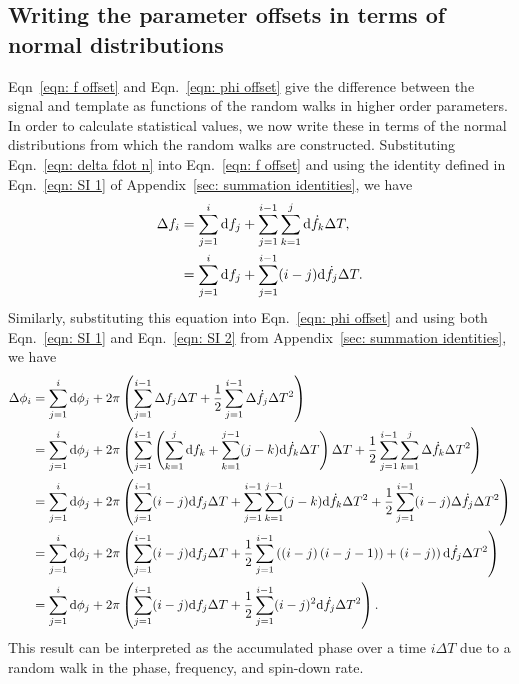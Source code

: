 \documentclass[../full_thesis/full_thesis.tex]{subfiles}
\begin{document}
\subsection{Writing the parameter offsets in terms of normal distributions}
Eqn~\eqref{eqn: f offset} and Eqn.~\eqref{eqn: phi offset} give the difference
between the signal and template as
functions of the random walks in higher order parameters. In order to calculate
statistical values, we now write these in terms of the normal distributions
from which the random walks are constructed.  Substituting Eqn.~\eqref{eqn:
delta fdot n} into Eqn.~\eqref{eqn: f offset} and using the identity defined
in Eqn.~\eqref{eqn: SI 1} of Appendix~\ref{sec: summation identities}, we have
\begin{align}
\Delta f_{i}  & = \sum_{j=1}^{i}\mathrm{d} f_{j}
+ \sum_{j=1}^{i-1}\sum_{k=1}^{j}\mathrm{d} \dot{f}_{k} \Delta T ,  \\
& = \sum_{j=1}^{i}\mathrm{d} f_{j}
+ \sum_{j=1}^{i-1}(i-j)\mathrm{d} \dot{f}_{j} \Delta T .
\label{eqn: delta f n}
\end{align}
Similarly, substituting this equation into Eqn.~\eqref{eqn: phi offset} and
using both Eqn.~\eqref{eqn: SI 1} and Eqn.~\eqref{eqn: SI 2} from
Appendix~\ref{sec: summation identities}, we have
\begin{align}
\begin{split}
\Delta\phi_{i} & = \sum_{j=1}^{i}\mathrm{d} \phi_{j}
+ 2\pi \left(\sum_{j=1}^{i-1}\Delta f_{j}\Delta T
+ \frac{1}{2}\sum_{j=1}^{i-1}\Delta\dot{f}_{j}\Delta T^{2}\right) \\
& = \sum_{j=1}^{i}\mathrm{d} \phi_{j} + 2\pi\left(\sum_{j=1}^{i-1}\left(\sum_{k=1}^{j}\mathrm{d}f_{k}
+ \sum_{k=1}^{j-1}(j-k)\mathrm{d}\dot{f}_{k}\Delta T\right)\Delta T
 + \frac{1}{2}\sum_{j=1}^{i-1}\sum_{k=1}^{j}\Delta\dot{f}_{k}\Delta T^{2} \right)  \\
& = \sum_{j=1}^{i}\mathrm{d} \phi_{j} + 2\pi\left(\sum_{j=1}^{i-1}(i-j)\mathrm{d}f_{j}\Delta T
 + \sum_{j=1}^{i-1}\sum_{k=1}^{j-1}(j-k)\mathrm{d}\dot{f}_{k}\Delta T^{2}
 + \frac{1}{2}\sum_{j=1}^{i-1}(i-j)\Delta\dot{f}_{j}\Delta T^{2} \right)  \\
& = \sum_{j=1}^{i}\mathrm{d} \phi_{j} + 2\pi\left(\sum_{j=1}^{i-1}(i-j)\mathrm{d}f_{j}\Delta T
 + \frac{1}{2}\sum_{j=1}^{i-1}\left(\left(i-j\right)\left(i-j-1)\right)
 + (i-j)\right)\mathrm{d}\dot{f}_{j}\Delta T^{2}\right)  \\
& = \sum_{j=1}^{i}\mathrm{d} \phi_{j} + 2\pi\left(\sum_{j=1}^{i-1}(i-j)\mathrm{d}f_{j}\Delta T
 + \frac{1}{2}\sum_{j=1}^{i-1}(i-j)^{2}\mathrm{d}\dot{f}_{j}\Delta T^{2}\right).
\end{split}
\label{eqn: delta phi n}
\end{align}
This result can be interpreted as the accumulated phase over a time $i\Delta
T$ due to a random walk in the phase, frequency, and spin-down rate.
\end{document}
